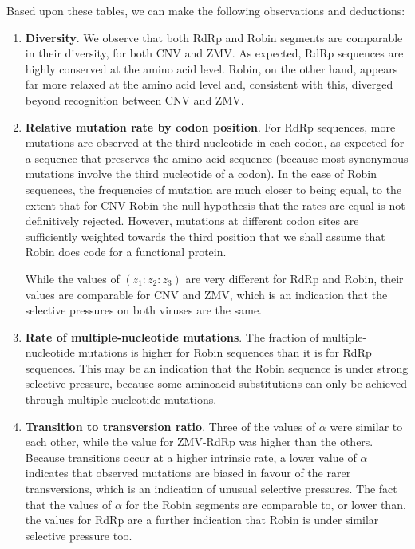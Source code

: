 \documentclass[unnumsec,webpdf,contemporary,large,namedate]{oup-authoring-template}%
\theoremstyle{thmstyleone}%
\theoremstyle{thmstyletwo}%
\theoremstyle{thmstylethree}%
\begin{document}
Based upon these tables, we can make the following observations and deductions:

\begin{enumerate}

\item{\bf Diversity}. We observe that both RdRp and Robin
segments are comparable in their diversity, for both CNV and ZMV.
As expected, RdRp sequences are highly conserved at the amino acid level.
Robin, on the other hand, appears far more relaxed at the amino acid level and, consistent with this, diverged beyond recognition between CNV and ZMV.

\item{\bf Relative mutation rate by codon position}. For RdRp sequences, more mutations are observed
at the third nucleotide in each codon, as expected for a sequence that preserves the amino acid sequence
(because most synonymous mutations involve the third nucleotide of a codon). In the case of Robin sequences,
the frequencies of mutation are much closer to being equal, to the extent that for CNV-Robin the null hypothesis
that the rates are equal is not definitively rejected. However, mutations at different
codon sites are sufficiently weighted towards the third position that we shall assume that Robin
does code for a functional protein.

While the values of $(z_1:z_2:z_3)$ are very different for RdRp and Robin, their values are
comparable for CNV and ZMV, which is an indication that the selective pressures on both
viruses are the same.

\item{\bf Rate of multiple-nucleotide mutations}. The fraction of multiple-nucleotide mutations is
higher for Robin sequences than it is for RdRp sequences. This may be an indication that the Robin sequence
is under strong selective pressure, because some aminoacid substitutions can only be achieved 
through multiple nucleotide mutations.  

\item{\bf Transition to transversion ratio}. Three of the values of $\alpha$ were similar to each other, while the value
for ZMV-RdRp was higher than the others. Because transitions occur at a higher intrinsic rate, a lower
value of $\alpha$ indicates that observed mutations are biased in favour of the rarer transversions,
which is an indication of unusual selective pressures. The fact that the values of $\alpha$ for the Robin segments are
comparable to, or lower than, the values for RdRp are a further indication that Robin
is under similar selective pressure too.


\end{enumerate}
\end{document}
